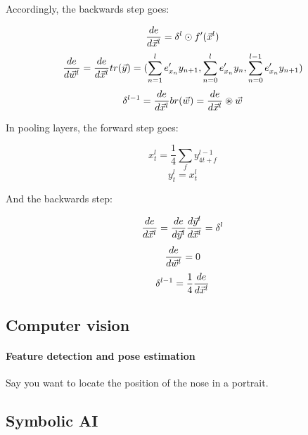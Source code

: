Accordingly, the backwards step goes:

$$  \frac{ \mathop{de} }{ \mathop{d\vec{x}^l} }  = \delta^l \odot f'(\vec{x}^l) $$
$$  \frac{ \mathop{de} }{ \mathop{d\vec{w}^l} }  =  \frac{ \mathop{de} }{ \mathop{d\vec{x}^l} }  tr(\vec{y}) = (\sum_{n=1}^l e'_{x_n} y_{n+1}, \sum_{n=0}^l e'_{x_n} y_n, \sum_{n=0}^{l-1} e'_{x_n} y_{n+1}) $$
$$ \delta^{l-1} =  \frac{ \mathop{de} }{ \mathop{d\vec{x}^l} }  br(\vec{w}) =  \frac{ \mathop{de} }{ \mathop{d\vec{x}^l} }  \circledast \vec{w} $$

In pooling layers, the forward step goes: 

$$ x_t^l = \frac{1}{4} \sum_f y_{4t + f}^{l-1} $$
$$ y_t^l = x_t^l $$

And the  backwards step: 

$$  \frac{ \mathop{de} }{ \mathop{d\vec{x}^l} }  =  \frac{ \mathop{de} }{ \mathop{d\vec{y}^l} }   \frac{ \mathop{d\vec{y}^l} }{ \mathop{d\vec{x}^l} }   = \delta^l  $$
$$  \frac{ \mathop{de} }{ \mathop{d\vec{w}^l} }  = 0 $$
$$ \delta^{l-1} = \frac{1}{4}  \frac{ \mathop{de} }{ \mathop{d\vec{x}^l} }   $$

\subsection{Computer vision}

\paragraph{Feature detection and pose estimation}

Say you want to locate the position of the nose in a portrait. 



\subsection{Symbolic AI}

